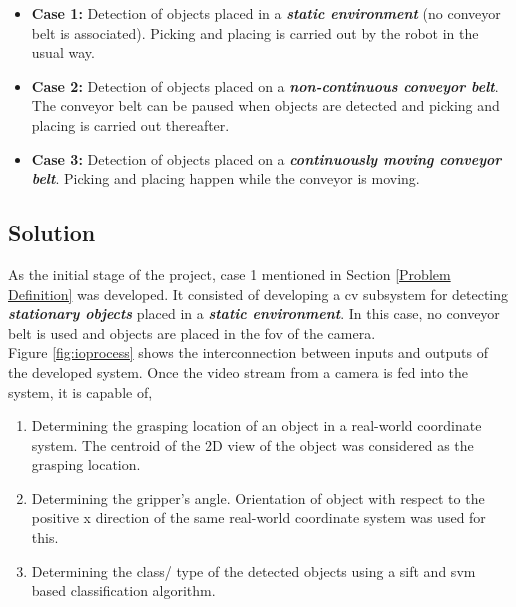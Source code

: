 \documentclass[a4paper,12pt]{report}%
\begin{document}
\begin{itemize}
	\item \textbf{Case 1:} Detection of objects placed in a \textbf{\textit{static environment}} (no conveyor belt is associated). Picking and placing is carried out by the robot in the usual way.
	
	\item  \textbf{Case 2:} Detection of objects placed on a \textbf{\textit{non-continuous conveyor belt}}. The conveyor belt can be paused when objects are detected and picking and placing is carried out thereafter.
	
	\item \textbf{Case 3:} Detection of objects placed on a \textbf{\textit{continuously moving conveyor belt}}. Picking and placing happen while the conveyor is moving.
\end{itemize}



\subsection{Solution}
\label{cv_subsystem}
As the initial stage of the project, case 1 mentioned in Section \ref{Problem Definition} was developed. It consisted of developing a \ac{cv} subsystem for detecting \textbf{\textit{stationary objects}} placed in a \textbf{\textit{static environment}}. In this case, no conveyor belt is used and objects are placed in the \ac{fov} of the camera.\\

Figure \ref{fig:ioprocess} shows the interconnection between inputs and outputs of the developed system. Once the video stream from a camera is fed into the system, it is capable of,



\begin{enumerate}
	\item Determining the grasping location of an object in a real-world coordinate system. The centroid of the 2D view of the object was considered as the grasping location. 
	
	\item Determining the gripper's angle. Orientation of object with respect to the positive x direction of the same real-world coordinate system was used for this.
	
	\item  Determining the class/ type of the detected objects using a \ac{sift} and \ac{svm} based classification algorithm.
\end{enumerate}
\end{document}
